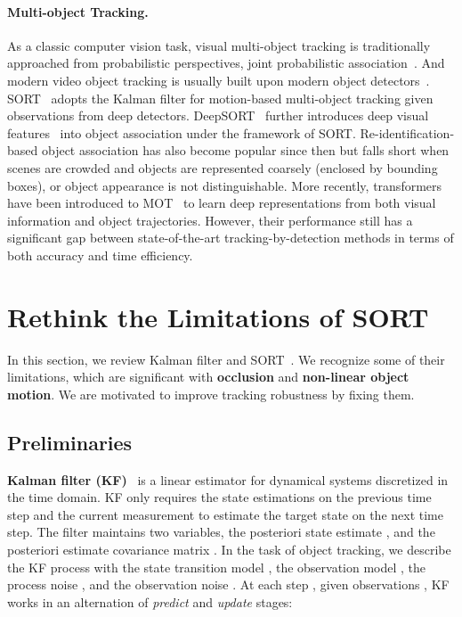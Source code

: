 \documentclass[10pt,twocolumn,letterpaper]{article}
\begin{document}
\paragraph{Multi-object Tracking.} As a classic computer vision task, visual multi-object tracking is traditionally approached from probabilistic perspectives, \eg joint probabilistic association~\cite{pdaf}. And modern video object tracking is usually built upon modern object detectors~\cite{yolo,ren2015faster,centernet}. SORT~\cite{bewley2016simple} adopts the Kalman filter for motion-based multi-object tracking given observations from deep detectors.
DeepSORT~\cite{deepsort} further introduces deep visual features~\cite{vgg,resnet} into object association under the framework of SORT. 
Re-identification-based object association\cite{deepsort,pang2021quasi,zhang2021fairmot} has also become popular since then but falls short when scenes are crowded and objects are represented coarsely (\eg enclosed by bounding boxes), or object appearance is not distinguishable. More recently, transformers~\cite{vaswani2017attention} have been introduced to MOT~\cite{meinhardt2021trackformer,zeng2022motr,sun2020transtrack,dsttrack} to learn deep representations from both visual information and object trajectories. However, their performance still has a significant gap between state-of-the-art tracking-by-detection methods in terms of both accuracy and time efficiency.


\section{Rethink the Limitations of SORT}
In this section, we review Kalman filter and SORT~\cite{bewley2016simple}. We recognize some of their limitations, which are significant with \textbf{occlusion} and \textbf{non-linear object motion}. We are motivated to improve tracking robustness by fixing them. 
\subsection{Preliminaries}
\label{sec:sort}
\noindent\textbf{Kalman filter (KF)}~\cite{kalman1960contributions} is a linear estimator for dynamical systems discretized in the time domain. 
KF only requires the state estimations on the previous time step and the current measurement to estimate the target state on the next time step.
The filter maintains two variables, the posteriori state estimate , and the posteriori estimate covariance matrix . 
In the task of object tracking, we describe the KF process with the state transition model , the observation model , the process noise , and the observation noise .
At each step , given observations , KF works in an alternation of \textit{predict} and \textit{update} stages:
\end{document}
